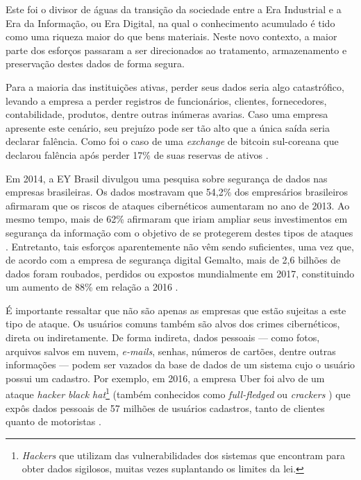 \documentclass[a4paper,10pt,oneside,conference,final,keeplastbox]{inatel}
\begin{document}
        Este foi o divisor de águas da transição da sociedade entre a Era Industrial e a Era da Informação, ou Era Digital, na qual o conhecimento acumulado é tido como uma riqueza maior do que bens materiais. Neste novo contexto, a maior parte dos esforços passaram a ser direcionados ao tratamento, armazenamento e preservação destes dados de forma segura.
    
        Para a maioria das instituições ativas, perder seus dados seria algo catastrófico, levando a empresa a perder registros de funcionários, clientes, fornecedores, contabilidade, produtos, dentre outras inúmeras avarias. Caso uma empresa apresente este cenário, seu prejuízo pode ser tão alto que a única saída seria declarar falência. Como foi o caso de uma \textit{exchange} de bitcoin sul-coreana que declarou falência após perder 17\% de suas reservas de ativos \cite{falencia2017tolotti}.
    
        Em 2014, a EY Brasil divulgou uma pesquisa sobre segurança de dados nas empresas brasileiras. Os dados mostravam que 54,2\% dos empresários brasileiros afirmaram que os riscos de ataques cibernéticos aumentaram no ano de 2013. Ao mesmo tempo, mais de 62\% afirmaram que iriam ampliar seus investimentos em segurança da informação com o objetivo de se protegerem destes tipos de ataques \cite{canal2014roubo}. Entretanto, tais esforços aparentemente não vêm sendo suficientes, uma vez que, de acordo com a empresa de segurança digital Gemalto, mais de 2,6 bilhões de dados foram roubados, perdidos ou expostos mundialmente em 2017, constituindo um aumento de 88\% em relação a 2016 \cite{computer2017roubo}.
    
        É importante ressaltar que não são apenas as empresas que estão sujeitas a este tipo de ataque. Os usuários comuns também são alvos dos crimes cibernéticos, direta ou indiretamente. De forma indireta, dados pessoais --- como fotos, arquivos salvos em nuvem, \textit{e-mails}, senhas, números de cartões, dentre outras informações --- podem ser vazados da base de dados de um sistema cujo o usuário possui um cadastro. Por exemplo, em 2016, a empresa Uber foi alvo de um ataque \textit{hacker black hat}\footnote{\textit{Hackers} que utilizam das vulnerabilidades dos sistemas que encontram para obter dados sigilosos, muitas vezes suplantando os limites da lei.} (também conhecidos como \textit{full-fledged} ou \textit{crackers} \cite{nakamura2007coorporativos}) que expôs dados pessoais de 57 milhões de usuários cadastros, tanto de clientes quanto de motoristas \cite{globo2017uber}.
    
\end{document}
